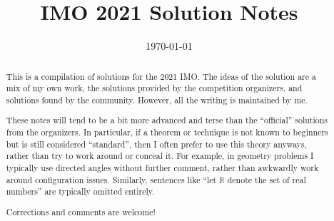 \documentclass[11pt]{scrartcl}
\title{IMO 2021 Solution Notes}
\date{\today}
\begin{document}
\maketitle

\begin{abstract}
This is a compilation of solutions
for the 2021 IMO.
The ideas of the solution are a mix of my own work,
the solutions provided by the competition organizers,
and solutions found by the community.
However, all the writing is maintained by me.

These notes will tend to be a bit more advanced and terse than the ``official''
solutions from the organizers.
In particular, if a theorem or technique is not known to beginners
but is still considered ``standard'', then I often prefer to
use this theory anyways, rather than try to work around or conceal it.
For example, in geometry problems I typically use directed angles
without further comment, rather than awkwardly work around configuration issues.
Similarly, sentences like ``let $\mathbb{R}$ denote the set of real numbers''
are typically omitted entirely.

Corrections and comments are welcome!
\end{abstract}

\tableofcontents
\newpage

\addtocounter{section}{-1}
\end{document}
